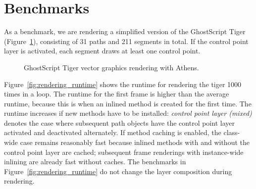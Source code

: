 \documentclass{sig-alternate}
\begin{document}
\section{Benchmarks}
\label{sec:bench}
As a benchmark, we are rendering a simplified version of the GhostScript Tiger (Figure~\ref{fig:gs_tiger}), consisting of 31 paths and 211 segments in total. If the control point layer is activated, each segment draws at least one control point.

\begin{figure}[t]
        \centering
        \hfill
    \caption{GhostScript Tiger vector graphics rendering with Athens.}
    \label{fig:gs_tiger}
\end{figure}

Figure~\ref{fig:rendering_runtime} shows the runtime for rendering the tiger 1000 times in a loop. The runtime for the first frame is higher than the average runtime, because this is when an inlined method is created for the first time. The runtime increases if new methods have to be installed: \emph{control point layer (mixed)} denotes the case where subsequent path objects have the control point layer activated and deactivated alternately. If method caching is enabled, the class-wide case remains reasonably fast because inlined methods with and without the control point layer are cached; subsequent frame renderings with instance-wide inlining are already fast without caches. The benchmarks in Figure~\ref{fig:rendering_runtime} do not change the layer composition during rendering. 
\end{document}
